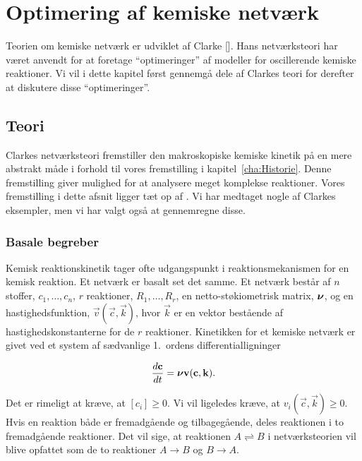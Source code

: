 \chapter{Optimering af kemiske netv{\ae}rk}
\label{clarke}
Teorien om kemiske netv{\ae}rk er udviklet af Clarke
[]. Hans netv{\ae}rksteori har v{\ae}ret
anvendt for at foretage ``optimeringer'' af modeller for
oscillerende kemiske reaktioner. Vi vil i dette kapitel
f{\o}rst gennemg{\aa} dele af Clarkes teori for derefter at
diskutere disse ``optimeringer''.

\section{Teori}
Clarkes netv{\ae}rksteori fremstiller den makroskopiske
kemiske kinetik p{\aa} en mere abstrakt m{\aa}de i forhold
til vores fremstilling i kapitel~\ref{cha:Historie}. Denne
fremstilling giver mulighed for at analysere meget
komplekse reaktioner. Vores fremstilling i dette afsnit
ligger t{\ae}t op af \cite{clarke}. Vi har medtaget nogle
af Clarkes eksempler, men vi har valgt ogs{\aa} at
gennemregne disse.

\subsection{Basale begreber}
\label{clarke:basal}
Kemisk reaktionskinetik tager ofte udgangspunkt i
reaktionsmekanismen for en kemisk reaktion. Et netv{\ae}rk
er basalt set det samme. Et netv{\ae}rk best{\aa}r af $n$
stoffer, $c_1, \ldots, c_n$, $r$ reaktioner, $R_1, \ldots,
R_r$, en netto-st{\o}kiometrisk matrix, $\mbox{\boldmath $\nu$}$, og
en hastighedsfunktion, $\vec{v}(\vec{c}, \vec{k})$, hvor
$\vec{k}$ er en vektor best{\aa}ende af
hastighedskonstanterne for de $r$ reaktioner. Kinetikken
for et kemiske netv{\ae}rk er givet ved et system af
s{\ae}dvanlige 1.\ ordens differentialligninger

\begin{equation}
\label{clarke:ODE}
\frac{d\mbox{${\bf c}$}}{dt} = \mbox{\boldmath $\nu$}\mbox{${\bf v}$}(\mbox{${\bf c}$}, \mbox{${\bf k}$}).
\end{equation}

Det er rimeligt at kr{\ae}ve, at $[c_i] \ge 0$. Vi vil
ligeledes kr{\ae}ve, at $v_i(\vec{c}, \vec{k}) \ge 0$. Hvis
en reaktion b{\aa}de er fremadg{\aa}ende og
tilbageg{\aa}ende, deles reaktionen i to fremadg{\aa}ende
reaktioner. Det vil sige, at reaktionen $A
\rightleftharpoons B$ i netv{\ae}rksteorien vil blive
opfattet som de to reaktioner $A\rightarrow B$ og
$B\rightarrow A$.

